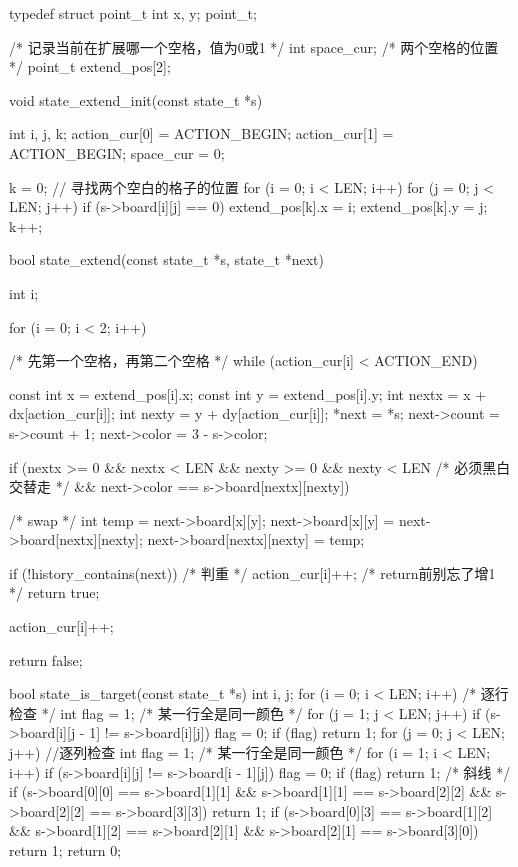 \begin{Codex}[label=four_adjacent.c]
typedef struct point_t {
    int x, y;
} point_t;

/* 记录当前在扩展哪一个空格，值为0或1 */
int space_cur;
/* 两个空格的位置 */
point_t extend_pos[2];

void state_extend_init(const state_t *s) {
    int i, j, k;
    action_cur[0] = ACTION_BEGIN;
    action_cur[1] = ACTION_BEGIN;
    space_cur = 0;

    k = 0;
    // 寻找两个空白的格子的位置
    for (i = 0; i < LEN; i++) {
        for (j = 0; j < LEN; j++) {
            if (s->board[i][j] == 0) {
                extend_pos[k].x = i;
                extend_pos[k].y = j;
                k++;
            }
        }
    }
}

bool state_extend(const state_t *s, state_t *next) {
    int i;

    for (i = 0; i < 2; i++) { /* 先第一个空格，再第二个空格 */
        while (action_cur[i] < ACTION_END) {
            const int x = extend_pos[i].x;
            const int y = extend_pos[i].y;
            int nextx = x + dx[action_cur[i]];
            int nexty = y + dy[action_cur[i]];
            *next = *s;
            next->count = s->count + 1;
            next->color = 3 - s->color;

            if (nextx >= 0 && nextx < LEN && nexty >= 0 && nexty < LEN
                    /* 必须黑白交替走 */
                    && next->color == s->board[nextx][nexty]) {
                /* swap */
                {
                    int temp = next->board[x][y];
                    next->board[x][y] = next->board[nextx][nexty];
                    next->board[nextx][nexty] = temp;
                }

                if (!history_contains(next)) { /* 判重 */
                    action_cur[i]++; /* return前别忘了增1 */
                    return true;
                }
            }
            action_cur[i]++;
        }
    }
    return false;
}

bool state_is_target(const state_t *s) {
    int i, j;
    for (i = 0; i < LEN; i++) {  /* 逐行检查 */
        int flag = 1;  /* 某一行全是同一颜色 */
        for (j = 1; j < LEN; j++)
            if (s->board[i][j - 1] != s->board[i][j])
                flag = 0;
        if (flag)
            return 1;
    }
    for (j = 0; j < LEN; j++) { //逐列检查
        int flag = 1;  /* 某一行全是同一颜色 */
        for (i = 1; i < LEN; i++)
            if (s->board[i][j] != s->board[i - 1][j]) flag = 0;
        if (flag) return 1;
    }
    /* 斜线 */
    if (s->board[0][0] == s->board[1][1] && s->board[1][1] == s->board[2][2]
            && s->board[2][2] == s->board[3][3])
        return 1;
    if (s->board[0][3] == s->board[1][2] && s->board[1][2] == s->board[2][1]
            && s->board[2][1] == s->board[3][0])
        return 1;
    return 0;
}
\end{Codex}

